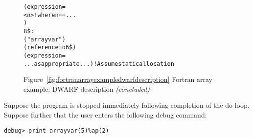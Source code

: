 \begin{figure}
\begin{dwflisting}
\begin{alltt}
            (expression=
                <n>            ! where n == ...
                )
8\$: 
        ("arrayvar")
        (reference to 6\$)
        (expression=
            ...as appropriate...)       ! Assume static allocation
\end{alltt}
\end{dwflisting}
\begin{center}

Figure~\ref{fig:fortranarrayexampledwarfdescription} Fortran array example: DWARF description \textit{(concluded)}
\end{center}
\end{figure}

Suppose 
the program is stopped immediately following completion
of the do loop. Suppose further that the user enters the
following debug command:

\begin{lstlisting}[numbers=none]
debug> print arrayvar(5)%ap(2)
\end{lstlisting}

